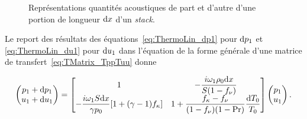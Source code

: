 \begin{figure}[!ht]
    \centering
    
    \caption{Représentations quantités acoustiques de part et d'autre d'une portion de longueur $\mathrm{d} x$ d'un \textit{stack}.}%
    \label{fig:WavesInStack}
\end{figure}

Le report des résultats des équations~\eqref{eq:ThermoLin_dp1} pour $\mathrm{d} p_1$ et \eqref{eq:ThermoLin_du1} pour $\mathrm{d} u_1$ dans l'équation de la forme générale d'une matrice de transfert~\eqref{eq:TMatrix_TppTuu} donne


\begin{equation}
	\begin{pmatrix}
	p_1 + \mathrm{d} p_1 \\
	u_1 + \mathrm{d} u_1
	\end{pmatrix} = \begin{bmatrix}
	1 & -\dfrac{i \omega_1 \rho_0 \mathrm{d} x}{S(1-f_\nu)} \\
	-\dfrac{i \omega_1 S \mathrm{d} x}{\gamma p_0}[1+(\gamma-1)f_\kappa] & 1+\dfrac{f_\kappa - f_\nu}{(1-f_\nu)(1-\mathrm{Pr})}\dfrac{\mathrm{d} T_0}{T_0}
	\end{bmatrix}\begin{pmatrix}
	p_1 \\
	u_1
	\end{pmatrix}.
	\label{eq:ThermoLin_Tmatrix}
\end{equation}

